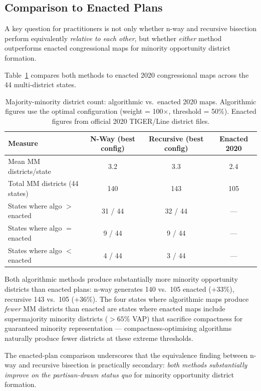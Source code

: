 \subsection{Comparison to Enacted Plans}

A key question for practitioners is not only whether n-way and recursive bisection perform equivalently \emph{relative to each other}, but whether \emph{either} method outperforms enacted congressional maps for minority opportunity district formation.

Table~\ref{tab:enacted-comparison} compares both methods to enacted 2020 congressional maps across the 44 multi-district states.

\begin{table}[h]
\centering\small
\caption{Majority-minority district count: algorithmic vs.\ enacted 2020 maps.
Algorithmic figures use the optimal configuration (weight = 100$\times$, threshold = 50\%).
Enacted figures from official 2020 TIGER/Line district files.}
\label{tab:enacted-comparison}
\begin{tabular}{lccc}
\toprule
Measure & N-Way (best config) & Recursive (best config) & Enacted 2020 \\
\midrule
Mean MM districts/state & 3.2 & 3.3 & 2.4 \\
Total MM districts (44 states) & 140 & 143 & 105 \\
States where algo $>$ enacted & 31 / 44 & 32 / 44 & — \\
States where algo $=$ enacted & 9 / 44 & 9 / 44 & — \\
States where algo $<$ enacted & 4 / 44 & 3 / 44 & — \\
\bottomrule
\end{tabular}
\end{table}

Both algorithmic methods produce substantially more minority opportunity districts than enacted plans: n-way generates 140 vs.\ 105 enacted ($+33\%$), recursive 143 vs.\ 105 ($+36\%$). The four states where algorithmic maps produce \emph{fewer} MM districts than enacted are states where enacted maps include supermajority minority districts ($>65\%$ VAP) that sacrifice compactness for guaranteed minority representation — compactness-optimising algorithms naturally produce fewer districts at these extreme thresholds.

The enacted-plan comparison underscores that the equivalence finding between n-way and recursive bisection is practically secondary: \emph{both methods substantially improve on the partisan-drawn status quo} for minority opportunity district formation.

